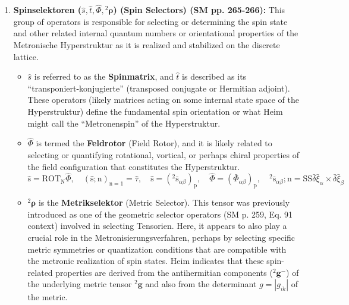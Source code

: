 \documentclass[12pt]{article}
\newcommand{\q}[1]{\enquote{#1}}
\newcommand{\kompositionsfeld}{{}^2\mathbf{g}}
\begin{document}
\begin{itemize}
\begin{enumerate}
        \begin{equation}
        \mathrm{C_k} = \varkappa_\mathrm{k} \sqrt[\mathrm{p}]{\tau} (\ )_\mathrm{k}, \quad \mathrm{x_k} = \mathrm{C_k};\mathrm{n}, \quad \mathrm{C_k} = \mathrm{X_k}, \quad {}^2\bar{\gamma};\mathrm{n} = \text{const}, \quad \mathrm{C_k} \neq \mathrm{X_k}, \quad {}^2\bar{\gamma};\mathrm{n} = {}^2\bar{\mathrm{g}} \tag{86b}
        \end{equation}
        \item \textbf{Spinselektoren (\( \hat{s}, \hat{t}, \hat{\Phi}, {}^2\bm{\rho} \)) (Spin Selectors) (SM pp. 265-266):} This group of operators is responsible for selecting or determining the spin state and other related internal quantum numbers or orientational properties of the Metronische Hyperstruktur as it is realized and stabilized on the discrete lattice.
        \begin{itemize}
            \item \( \hat{s} \) is referred to as the \textbf{Spinmatrix}, and \( \hat{t} \) is described as its \q{transponiert-konjugierte} (transposed conjugate or Hermitian adjoint). These operators (likely matrices acting on some internal state space of the Hyperstruktur) define the fundamental spin orientation or what Heim might call the \q{Metronenspin} of the Hyperstruktur.
            \item \( \hat{\Phi} \) is termed the \textbf{Feldrotor} (Field Rotor), and it is likely related to selecting or quantifying rotational, vortical, or perhaps chiral properties of the field configuration that constitutes the Hyperstruktur.
            \begin{equation}
            \hat{\mathrm{s}} = \mathrm{ROT_N} \hat{\Phi}, \quad (\hat{\mathrm{s}};\mathrm{n})_{\mathrm{n=1}} = \hat{\tau}, \quad \hat{\mathrm{s}} = ({}^2\bar{\mathrm{s}}_{\alpha\beta})_\mathrm{p}, \quad \hat{\Phi} = (\bar{\Phi}_{\alpha\beta})_\mathrm{p}, \quad {}^2\bar{\mathrm{s}}_{\alpha\beta};\mathrm{n} = \mathrm{SS} \bar{\delta}\bar{\xi}_\alpha \times \bar{\delta}\bar{\xi}_\beta \tag{87}
            \end{equation}
            \item \( {}^2\bm{\rho} \) is the \textbf{Metrikselektor} (Metric Selector). This tensor was previously introduced as one of the geometric selector operators (SM p. 259, Eq. 91 context) involved in selecting Tensorien. Here, it appears to also play a crucial role in the Metronisierungsverfahren, perhaps by selecting specific metric symmetries or quantization conditions that are compatible with the metronic realization of spin states. Heim indicates that these spin-related properties are derived from the antihermitian components (\( \kompositionsfeld^- \)) of the underlying metric tensor \( \kompositionsfeld \) and also from the determinant \( g = |g_{ik}| \) of the metric.

\end{itemize}
\end{enumerate}
\end{itemize}
\end{document}

